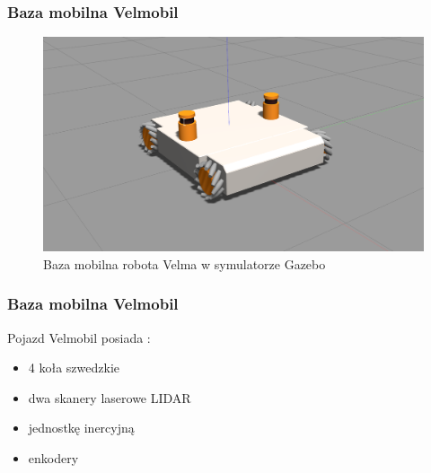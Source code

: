 \begin{frame} 
    \frametitle{Baza mobilna Velmobil}
    \begin{figure}
    \includegraphics[scale=0.20]{./images/omnivelma_gz.png}
    \caption{Baza mobilna robota Velma w symulatorze Gazebo}
    \end{figure}
\end{frame}

\begin{frame}
    \frametitle{Baza mobilna Velmobil}
    Pojazd Velmobil posiada \cite{walas}:  
    \begin{itemize}
        \item 4 koła szwedzkie
        \item dwa skanery laserowe LIDAR
        \item jednostkę inercyjną
        \item enkodery %
    \end{itemize}
\end{frame}